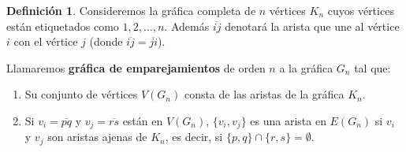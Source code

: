 \documentclass[12pt]{book}
\theoremstyle{definition}
\newtheorem{definition}[theorem]{Definición}
\newcounter{in}
\newcounter{ini}
\begin{document}
\begin{definition}
  \label{graf-emparejamientos}
  Consideremos la gráfica completa de $n$ vértices $K_{n}$ cuyos
  vértices están etiquetados como $1,2,\ldots,n$. Además
  $\overline{ij}$ denotará la arista que une al vértice $i$ con el
  vértice $j$ (donde $\overline{ij}=\overline{ji}$).
  
  Llamaremos \textbf{gráfica de emparejamientos} de orden $n$ a la
  gráfica $G_{n}$ tal que:
  
  \begin{enumerate}
  \item Su conjunto de vértices $V(G_{n})$ consta de las aristas de la gráfica
    $K_{n}$. 
  \item Si $v_{i}=\overline{pq}$ y $v_{j}=\overline{rs}$ están en
    $V(G_{n})$, $\{v_{i},v_{j}\}$ es una arista en $E(G_{n})$ si $v_{i}$
    y $v_{j}$ son aristas ajenas de $K_{n}$, es decir, si $\{p,q\}\cap\{r,s\}=\emptyset$.
  \end{enumerate}
\end{definition} 
\end{document}
